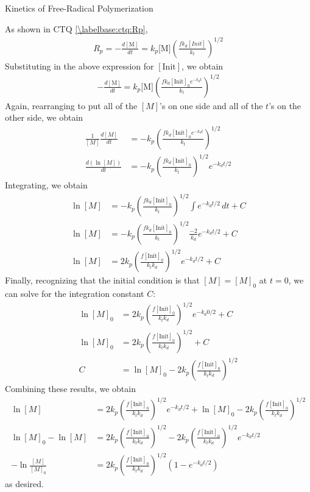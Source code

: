 \begin{activity}{Kinetics of Free-Radical Polymerization}
\begin{exercises}
\begin{enumerate}
				\begin{solution}{}
					As shown in CTQ \ref{\labelbase:ctq:Rp},
					\begin{align*}
						R_p = -\frac{d[\text{M}]}{dt} = k_p\text{[M]}\left(\frac{fk_d[Init]}{k_t}\right)^{1/2}
					\end{align*}
					Substituting in the above expression for $[\text{Init}]$, we obtain
					\begin{align*}
						-\frac{d[\text{M}]}{dt} = k_p\text{[M]}\left(\frac{fk_d[\text{Init}]_0 e^{-k_d t}}{k_t}\right)^{1/2}
					\end{align*}
					Again, rearranging to put all of the $[M]$'s on one side and all of the $t$'s on the other side, we obtain
					\begin{align*}
						\frac{1}{[M]}\frac{d[M]}{dt} &= -k_p\left(\frac{fk_d[\text{Init}]_0 e^{-k_d t}}{k_t}\right)^{1/2}\\
						\frac{d(\ln [M])}{dt} &= -k_p\left(\frac{fk_d[\text{Init}]_0 }{k_t}\right)^{1/2}e^{-k_d t/2}
					\end{align*}
					Integrating, we obtain
					\begin{align*}
						\ln [M] &= -k_p\left(\frac{fk_d[\text{Init}]_0 }{k_t}\right)^{1/2} \int e^{-k_d t/2} \, dt + C\\
						\ln [M] &= -k_p\left(\frac{fk_d[\text{Init}]_0 }{k_t}\right)^{1/2} \frac{-2}{k_d} e^{-k_d t/2} + C\\
						\ln [M] &= 2k_p\left(\frac{f[\text{Init}]_0 }{k_t k_d}\right)^{1/2} e^{-k_d t/2} + C
					\end{align*}
					Finally, recognizing that the initial condition is that $[M] = [M]_0$ at $t=0$, we can solve for the integration constant $C$:
					\begin{align*}
						\ln [M]_0 &= 2k_p\left(\frac{f[\text{Init}]_0 }{k_t k_d}\right)^{1/2} e^{-k_d 0/2} + C\\
						\ln [M]_0 &= 2k_p\left(\frac{f[\text{Init}]_0 }{k_t k_d}\right)^{1/2} + C\\
						C &= \ln [M]_0 - 2k_p\left(\frac{f[\text{Init}]_0 }{k_t k_d}\right)^{1/2} 
					\end{align*}
					Combining these results, we obtain
					\begin{align*}
						\ln [M] &= 2k_p\left(\frac{f[\text{Init}]_0 }{k_t k_d}\right)^{1/2} e^{-k_d t/2} + \ln [M]_0 - 2k_p\left(\frac{f[\text{Init}]_0 }{k_t k_d}\right)^{1/2}\\
						\ln[M]_0 - \ln[M] &= 2k_p\left(\frac{f[\text{Init}]_0 }{k_t k_d}\right)^{1/2} - 2k_p\left(\frac{f[\text{Init}]_0 }{k_t k_d}\right)^{1/2} e^{-k_d t/2} \\
						-\ln\frac{[M]}{[M]_0} &= 2k_p\left(\frac{f[\text{Init}]_0 }{k_t k_d}\right)^{1/2} \left(1- e^{-k_d t/2} \right)
					\end{align*}
					as desired.
				\end{solution}
				

\end{enumerate}
\end{exercises}
\end{activity}
